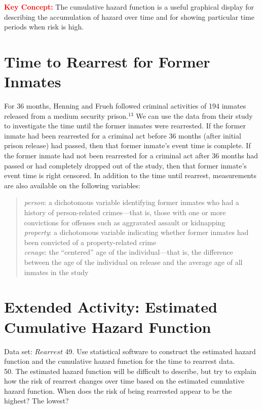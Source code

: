 \documentclass[
]{report}
\begin{document}
\Large

\textbf{\textcolor{red}{Key Concept:}}
\color{red}
The cumulative hazard function is a useful graphical display for describing the accumulation of hazard
over time and for showing particular time periods when risk is high.
\color{black}
\normalsize

\section*{Time to Rearrest for Former Inmates}\label{time-to-rearrest-for-former-inmates}

For 36 months, Henning and Frueh followed criminal activities of 194 inmates released from a medium security prison.\(^13\) We can use the data from their study to investigate the time until the former inmates were rearrested. If the former inmate had been rearrested for a criminal act before 36 months (after initial prison release) had passed, then that former inmate's event time is complete. If the former inmate had not been rearrested for a criminal act after 36 months had passed or had completely dropped out of the study, then that former inmate's event time is right censored. In addition to the time until rearrest, measurements are also available on the following variables:

\begin{quote}
\emph{person}: a dichotomous variable identifying former inmates who had a history of person-related crimes---that is, those with one or more convictions for offenses such as aggravated assault or kidnapping\\
\emph{property}: a dichotomous variable indicating whether former inmates had been convicted of a property-related crime\\
\emph{cenage}: the ``centered'' age of the individual---that is, the difference between the age of the individual on release and the average age of all inmates in the study
\end{quote}

\section*{Extended Activity: Estimated Cumulative Hazard Function}\label{extended-activity-estimated-cumulative-hazard-function-1}

Data set: \(Rearrest\)
49. Use statistical software to construct the estimated hazard function and the cumulative hazard function for the time to rearrest data.\\
50. The estimated hazard function will be difficult to describe, but try to explain how the risk of rearrest changes over time based on the estimated cumulative hazard function. When does the risk of being rearrested appear to be the highest? The lowest?
\end{document}
